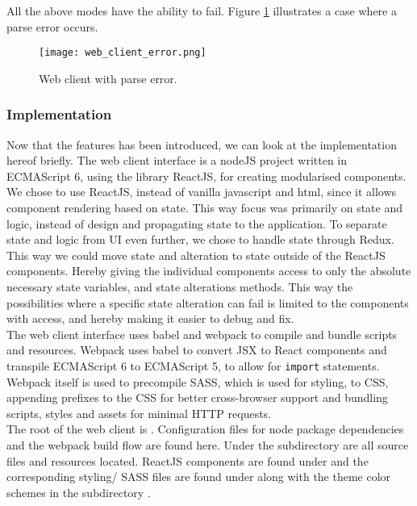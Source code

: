 \noindent
All the above modes have the ability to fail. Figure \ref{fig:web_client_error} illustrates a case where a parse error occurs.

\begin{figure}[H]
  \texttt{[image: web\_client\_error.png]}
  \caption{Web client with parse error.}
  \label{fig:web_client_error}
\end{figure}


\subsubsection{Implementation}

\noindent
Now that the features has been introduced, we can look at the implementation hereof briefly.
The web client interface is a nodeJS project written in ECMAScript 6, using the library ReactJS, for creating modularised components.
We chose to use ReactJS, instead of vanilla javascript and html, since it allows component rendering based on state.
This way focus was primarily on state and logic, instead of design and propagating state to the application.
To separate state and logic from UI even further, we chose to handle state through Redux.
This way we could move state and alteration to state outside of the ReactJS components. Hereby giving the individual components access to only the absolute necessary state variables, and state alterations methods.
This way the possibilities where a specific state alteration can fail is limited to the components with access, and hereby making it easier to debug and fix.\\

\noindent
The web client interface uses babel and webpack to compile and bundle scripts and resources.
Webpack uses babel to convert JSX to React components and transpile ECMAScript 6 to ECMAScript 5, to allow for \texttt{import} statements.
Webpack itself is used to precompile SASS, which is used for styling, to CSS, appending prefixes to the CSS for better cross-browser support and bundling scripts, styles and assets for minimal HTTP requests.\\

\noindent
The root of the web client is . Configuration files for node package dependencies and the webpack build flow are found here.
Under the subdirectory  are all source files and resources located.
ReactJS components are found under  and the corresponding styling/ SASS files are found under  along with the theme color schemes in the subdirectory .\\

